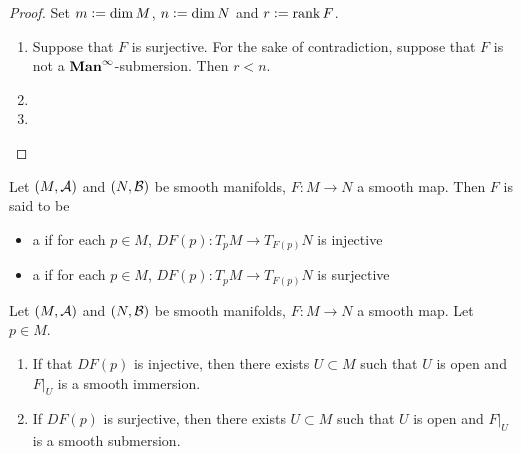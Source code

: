 \documentclass{book}
\begin{document}
	\begin{proof}
		Set $m \vcentcolon= \dim M$, $n \vcentcolon= \dim N$ and $r \vcentcolon= \operatorname{\text{rank}} F$. 
		\begin{enumerate}
			\item Suppose that $F$ is surjective. For the sake of contradiction, suppose that $F$ is not a $\operatorname*{\text{\textbf{Man}}^{\infty}}$-submersion. Then $r < n$. 
			\item 
			\item 
		\end{enumerate}
	\end{proof}
	
	
	\begin{defn} 
		Let $(M, \mathcal{A})$ and $(N, \mathcal{B})$ be smooth manifolds, $F: M \rightarrow N$ a smooth map. Then $F$ is said to be 
		\begin{itemize}
		
			\item a  if for each $p \in M$, $DF(p):T_pM\rightarrow T_{F(p)}N$ is injective
			\item a  if for each $p \in M$, $DF(p) :T_pM\rightarrow T_{F(p)}N$ is surjective
		\end{itemize}
	\end{defn}

	\begin{ex} 
	Let $(M, \mathcal{A})$ and $(N, \mathcal{B})$ be smooth manifolds, $F: M \rightarrow N$ a smooth map. Let $p \in M$.
	\begin{enumerate}
		\item If that $DF(p)$ is injective, then there exists $U \subset M$ such that $U$ is open and $F|_U$ is a smooth immersion.
		\item If $DF(p)$ is surjective, then there exists $U \subset M$ such that $U$ is open and $F|_U$ is a smooth submersion.
	\end{enumerate}
	\end{ex}
\end{document}
